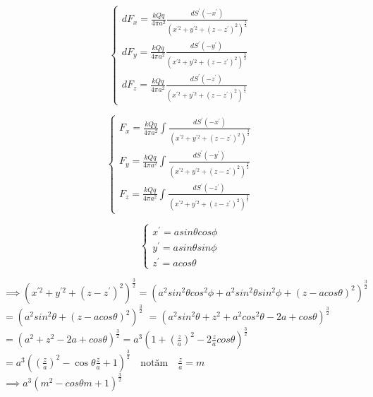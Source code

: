 \documentclass[12pt]{article}
\begin{document}
\begin{equation}
    \begin{cases}
        dF_{x} = \frac{ kQq }{ 4\pi a^{2} } \frac{ dS^{'}(-x^{'}) }{ {(x^{'2} + y^{'2} + (z-z^{'})^{2})}^{\frac{3}{2}} }\\
        dF_{y} = \frac{ kQq }{ 4\pi a^{2} } \frac{ dS^{'}(-y^{'}) }{ {(x^{'2} + y^{'2} + (z-z^{'})^{2})}^{\frac{3}{2}} }\\
        dF_{z} = \frac{ kQq }{ 4\pi a^{2} } \frac{ dS^{'}(-z^{'}) }{ {(x^{'2} + y^{'2} + (z-z^{'})^{2})}^{\frac{3}{2}} }
    \end{cases}
\end{equation}

\begin{equation}
    \begin{cases}
        F_{x} = \frac{ kQq }{ 4\pi a^{2} }\int_{}^{} \frac{ dS^{'}(-x^{'}) }{ {(x^{'2} + y^{'2} + (z-z^{'})^{2})}^{\frac{3}{2}} }\\
        F_{y} = \frac{ kQq }{ 4\pi a^{2} }\int_{}^{} \frac{ dS^{'}(-y^{'}) }{ {(x^{'2} + y^{'2} + (z-z^{'})^{2})}^{\frac{3}{2}} }\\
        F_{z} = \frac{ kQq }{ 4\pi a^{2} }\int_{}^{} \frac{ dS^{'}(-z^{'}) }{ {(x^{'2} + y^{'2} + (z-z^{'})^{2})}^{\frac{3}{2}} }
    \end{cases}
\end{equation}

\begin{equation}
    \begin{cases}
        x^{'}=a sin\theta cos\phi\\
        y^{'}=a sin\theta sin\phi\\
        z^{'}=a cos\theta
    \end{cases}
\end{equation}

$ \implies {(x^{'2}+y^{'2}+ {(z-z^{'})}^{2})}^{\frac{3}{2}} = {( a^{2} sin^{2}\theta cos^{2}\phi + a^{2}sin^{2}\theta sin^{2}\phi + {(z- a cos\theta)}^{2} )}^{\frac{3}{2}} $
$ = {( a^{2} sin^{2} \theta + {( z - a cos\theta )}^{2} )}^{\frac{3}{2}} $
$ ={( a^{2} sin^{2}\theta + z^{2} + a^{2} cos^{2}\theta - 2a + cos\theta )}^{\frac{3}{2}} $\\
$ = {( a^{2} + z^{2} -2a + cos\theta )}^{\frac{3}{2}} = a^{3} {( 1+ {(\frac{z}{a})}^{2} - 2 \frac{z}{a} cos\theta )}^{\frac{3}{2}}$\\
$ = a^{3} \left( \left( \frac{z}{a} \right)^{2} - \cos\theta \frac{z}{a} + 1 \right) ^ {\frac{3}{2}} \quad \text{notăm} \quad \frac{z}{a} = m $\\
$ \implies a^{3} {(m^{2} - cos\theta m +1 )}^{\frac{3}{2}} $
\end{document}
